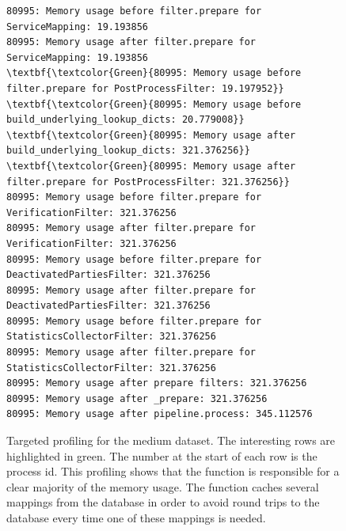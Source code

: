\begin{figure}[ht]
\begin{Verbatim}[fontsize=\tiny]
80995: Memory usage before filter.prepare for ServiceMapping: 19.193856
80995: Memory usage after filter.prepare for ServiceMapping: 19.193856
\textbf{\textcolor{Green}{80995: Memory usage before filter.prepare for PostProcessFilter: 19.197952}}
\textbf{\textcolor{Green}{80995: Memory usage before build_underlying_lookup_dicts: 20.779008}}
\textbf{\textcolor{Green}{80995: Memory usage after build_underlying_lookup_dicts: 321.376256}}
\textbf{\textcolor{Green}{80995: Memory usage after filter.prepare for PostProcessFilter: 321.376256}}
80995: Memory usage before filter.prepare for VerificationFilter: 321.376256
80995: Memory usage after filter.prepare for VerificationFilter: 321.376256
80995: Memory usage before filter.prepare for DeactivatedPartiesFilter: 321.376256
80995: Memory usage after filter.prepare for DeactivatedPartiesFilter: 321.376256
80995: Memory usage before filter.prepare for StatisticsCollectorFilter: 321.376256
80995: Memory usage after filter.prepare for StatisticsCollectorFilter: 321.376256
80995: Memory usage after prepare filters: 321.376256
80995: Memory usage after _prepare: 321.376256
80995: Memory usage after pipeline.process: 345.112576
\end{Verbatim}
\caption[Targeted memory profiling for the medium dataset]{Targeted profiling for the medium dataset. The interesting rows are highlighted in green.
The number at the start of each row is the process id.
This profiling shows that the
function  is responsible for a clear majority of the memory usage. The function caches several mappings
from the database in order to avoid round trips to the database every time one of these mappings is needed.}
\label{fig:target_profiler_medium}
\end{figure}

\FloatBarrier
